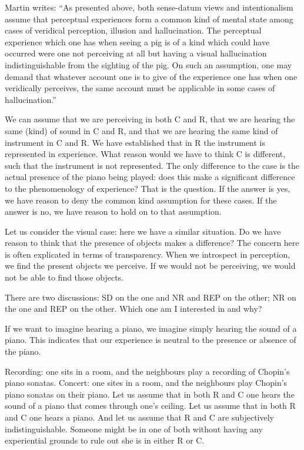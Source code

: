 \documentclass[sloppy, journal, git, bytitle, dodraft]{humapap}
\begin{document}
Martin writes: ``As presented above, both sense-datum views and intentionalism assume that perceptual experiences form a common kind of mental state among cases of veridical perception, illusion and hallucination. The perceptual experience which one has when seeing a pig is of a kind which could have occurred were one not perceiving at all but having a visual hallucination indistinguishable from the sighting of the pig. On such an assumption, one may demand that whatever account one is to give of the experience one has when one veridically perceives, the same account must be applicable in some cases of hallucination.''

We can assume that we are perceiving in both C and R, that we are hearing the same (kind) of sound in C and R, and that we are hearing the same kind of instrument in C and R. We have established that in R the instrument is represented in experience. What reason would we have to think C is different, such that the instrument is not represented. The only difference to the case is the actual presence of the piano being played: does this make a significant difference to the phenomenology of experience? That is the question. If the answer is yes, we have reason to deny the common kind assumption for these cases. If the answer is no, we have reason to hold on to that assumption. 

Let us consider the visual case: here we have a similar situation. Do we have reason to think that the presence of objects makes a difference? The concern here is often explicated in terms of transparency. When we introspect in perception, we find the present objects we perceive. If we would not be perceiving, we would not be able to find those objects.

There are two discussions: SD on the one and NR and REP on the other; NR on the one and REP on the other. Which one am I interested in and why? 

If we want to imagine hearing a piano, we imagine simply hearing the sound of a piano. This indicates that our experience is neutral to the presence or absence of the piano. 




Recording: one sits in a room, and the neighbours play a recording of Chopin's piano sonatas. Concert: one sites in a room, and the neighbours play Chopin's piano sonatas on their piano. Let us assume that in both R and C one hears the sound of a piano that comes through one's ceiling. Let us assume that in both R and C one hears a piano. And let us assume that R and C are subjectively indistinguishable. Someone might be in one of both without having any experiential grounds to rule out she is in either R or C. 
\end{document}
